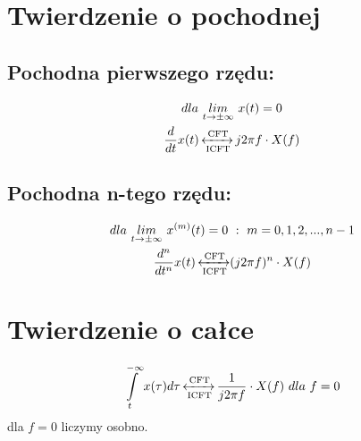 \section{Twierdzenie o pochodnej}
    \subsection*{Pochodna pierwszego rzędu:}
        \begin{gather*}
            dla\ \underset{t\rightarrow\pm\infty}{lim}\ x(t) = 0\\
            \frac{d}{dt}x(t) \operatorname{\xleftrightarrow[\text{ICFT}]{\text{CFT}}} j2\pi f\cdot X(f)
        \end{gather*}
    \subsection*{Pochodna \textbf{n}-tego rzędu:}
        \begin{gather*}
            dla\ \underset{t\rightarrow\pm\infty}{lim}\ x^{(m)}(t) = 0\ :\ m = 0,1,2,...,n-1\\
            \frac{d^n}{dt^n}x(t)  \FT (j2\pi f)^{n}\cdot X(f)
        \end{gather*}

\section{Twierdzenie o całce}
    \begin{gather*}
        \int\limits^{-\infty}_{t} x(\tau)d\tau \operatorname{\xleftrightarrow[\text{ICFT}]{\text{CFT}}} \frac{1}{j2\pi f}\cdot X(f)\ dla\ f=0
    \end{gather*}
        dla $f=0$ liczymy osobno.
    
